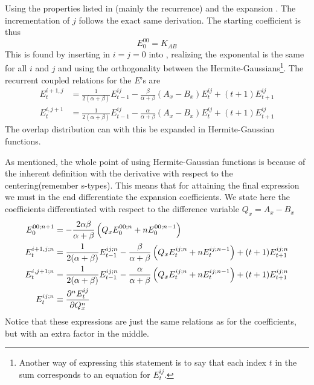     Using the properties listed in (mainly the
    recurrence) and the expansion . The incrementation of $j$
    follows the exact same derivation. The starting coefficient is thus
        \begin{equation}
            E^{00}_0 = K_{AB}
        \end{equation}
    This is found by inserting in $i=j=0$ into , realizing
    the exponental is the same for all $i$ and $j$ and using the orthogonality
    between the Hermite-Gaussians\footnote{Another way of expressing this
    statement is to say that each index $t$ in the sum corresponds to an
    equation for $E^{ij}_t$.}. The recurrent coupled relations for the
    $E$'s are
        \begin{equation}
            \begin{aligned}
                E^{i+1,j}_t &= \frac{1}{2(\alpha + \beta)}E^{ij}_{t-1} -
                \frac{\beta}{\alpha+\beta}(A_x - B_x)E^{ij}_t +
                (t+1)E^{ij}_{t+1} \\
                E^{i,j+1}_t &= \frac{1}{2(\alpha + \beta)}E^{ij}_{t-1} -
                \frac{\alpha}{\alpha+\beta}(A_x - B_x)E^{ij}_t +
                (t+1)E^{ij}_{t+1}
            \end{aligned}
        \end{equation}
    The overlap distribution can with this be expanded in Hermite-Gaussian
    functions.

    As mentioned, the whole point of using Hermite-Gaussian functions is
    because of the inherent definition with the derivative with respect to the
    centering(remember s-types). This means that for attaining the final
    expression we must in the end differentiate the expansion coefficients. We
    state here the coefficients differentiated with respect to the difference
    variable $Q_x=A_x-B_x$
        \begin{equation}
            \begin{aligned}
                E^{00;n+1}_0 &=
                -\frac{2\alpha\beta}{\alpha+\beta}\left(Q_xE^{00;n}_0 +
                nE^{00;n-1}_0\right) \\
                E^{i+1,j;n}_t &= \frac{1}{2(\alpha+\beta)}E^{ij;n}_{t-1} -
                \frac{\beta}{\alpha+\beta}\left(Q_xE^{ij;n}_t +
                nE^{ij;n-1}_t\right) + (t+1)E^{ij;n}_{t+1} \\
                E^{i,j+1;n}_t &= \frac{1}{2(\alpha+\beta)}E^{ij;n}_{t-1} -
                \frac{\alpha}{\alpha+\beta}\left(Q_xE^{ij;n}_t +
                nE^{ij;n-1}_t\right) + (t+1)E^{ij;n}_{t+1} \\
                E^{ij;n}_t &\equiv \frac{\mathrm{\partial}^n E^{ij}_t}{\mathrm{\partial} Q^n_x}
            \end{aligned}
        \end{equation}
    Notice that these expressions are just the same relations as for the
    coefficients, but with an extra factor in the middle.

